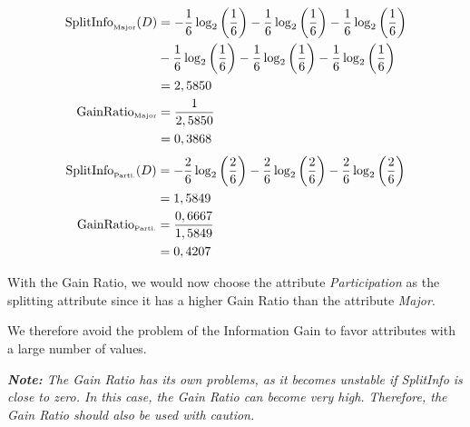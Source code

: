 \documentclass[
english,
smallborders
]{i6prcsht}
\newcommand{\OfAttribute}[1]{_{\text{\tiny #1}}}
\begin{document}
\begin{solution}
	\begin{alignat*}{2}
		\text{SplitInfo}\OfAttribute{Major}(D) & = -\frac{1}{6} \log_2\left(\frac{1}{6}\right) - \frac{1}{6} \log_2\left(\frac{1}{6}\right) - \frac{1}{6} \log_2\left(\frac{1}{6}\right) \\
		                                       & - \frac{1}{6} \log_2\left(\frac{1}{6}\right) - \frac{1}{6} \log_2\left(\frac{1}{6}\right) - \frac{1}{6} \log_2\left(\frac{1}{6}\right)  \\
		                                       & = 2,5850                                                                                                                                \\
		\text{GainRatio}\OfAttribute{Major}    & = \frac{1}{2,5850}                                                                                                                      \\
		                                       & = 0,3868                                                                                                                                \\
	\end{alignat*}
	\begin{alignat*}{2}
		\text{SplitInfo}\OfAttribute{Parti.}(D) & = -\frac{2}{6} \log_2\left(\frac{2}{6}\right) - \frac{2}{6} \log_2\left(\frac{2}{6}\right) - \frac{2}{6} \log_2\left(\frac{2}{6}\right) \\
		                                        & = 1,5849                                                                                                                                \\
		\text{GainRatio}\OfAttribute{Parti.}    & = \frac{0,6667}{1,5849}                                                                                                                 \\
		                                        & = 0,4207                                                                                                                                \\
	\end{alignat*}
	
	With the Gain Ratio, we would now choose the attribute \textit{Participation} as the splitting attribute since it has a higher Gain Ratio than the attribute \textit{Major}.
	
	We therefore avoid the problem of the Information Gain to favor attributes with a large number of values.
	
	\textit{\textbf{Note:} The Gain Ratio has its own problems, as it becomes unstable if SplitInfo is close to zero. In this case, the Gain Ratio can become very high. Therefore, the Gain Ratio should also be used with caution.}
	
\end{solution}
\end{document}
